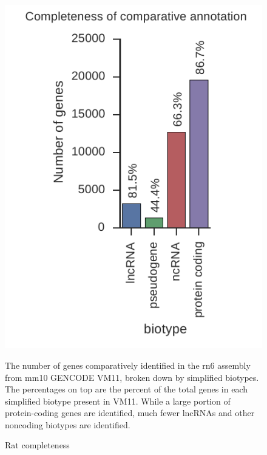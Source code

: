 \begin{figure}
\centering
\includegraphics[]{Supplemental_Figure_S8.pdf}
\caption{Rat completeness}
The number of genes comparatively identified in the rn6 assembly from mm10 GENCODE VM11, broken down by simplified biotypes. The percentages on top are the percent of the total genes in each simplified biotype present in VM11. While a large portion of protein-coding genes are identified, much fewer lncRNAs and other noncoding biotypes are identified.
\label{supp_fig:rat_completeness}
\end{figure}

